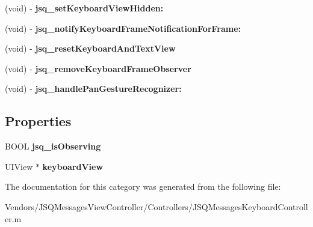 \begin{DoxyCompactItemize}
\item 
\hypertarget{category_j_s_q_messages_keyboard_controller_07_08_a1c4caa22f2eee5d2f6cac47e33a83d88}{}(void) -\/ {\bfseries jsq\+\_\+set\+Keyboard\+View\+Hidden\+:}\label{category_j_s_q_messages_keyboard_controller_07_08_a1c4caa22f2eee5d2f6cac47e33a83d88}

\item 
\hypertarget{category_j_s_q_messages_keyboard_controller_07_08_a1ca76e371471ca4d20aab547096079c9}{}(void) -\/ {\bfseries jsq\+\_\+notify\+Keyboard\+Frame\+Notification\+For\+Frame\+:}\label{category_j_s_q_messages_keyboard_controller_07_08_a1ca76e371471ca4d20aab547096079c9}

\item 
\hypertarget{category_j_s_q_messages_keyboard_controller_07_08_a2ecfdacc0439b70e6ab1c5dd03895ae9}{}(void) -\/ {\bfseries jsq\+\_\+reset\+Keyboard\+And\+Text\+View}\label{category_j_s_q_messages_keyboard_controller_07_08_a2ecfdacc0439b70e6ab1c5dd03895ae9}

\item 
\hypertarget{category_j_s_q_messages_keyboard_controller_07_08_ae546c926b53ecd316676e9b1762b3ac0}{}(void) -\/ {\bfseries jsq\+\_\+remove\+Keyboard\+Frame\+Observer}\label{category_j_s_q_messages_keyboard_controller_07_08_ae546c926b53ecd316676e9b1762b3ac0}

\item 
\hypertarget{category_j_s_q_messages_keyboard_controller_07_08_ab31eab0246d9198a3c81257f7361e9b9}{}(void) -\/ {\bfseries jsq\+\_\+handle\+Pan\+Gesture\+Recognizer\+:}\label{category_j_s_q_messages_keyboard_controller_07_08_ab31eab0246d9198a3c81257f7361e9b9}

\end{DoxyCompactItemize}
\subsection*{Properties}
\begin{DoxyCompactItemize}
\item 
\hypertarget{category_j_s_q_messages_keyboard_controller_07_08_a1aed8139f5222d4c7750da57fd2f0102}{}B\+O\+O\+L {\bfseries jsq\+\_\+is\+Observing}\label{category_j_s_q_messages_keyboard_controller_07_08_a1aed8139f5222d4c7750da57fd2f0102}

\item 
\hypertarget{category_j_s_q_messages_keyboard_controller_07_08_af8b90e2900ea8f9c9c762ce0f11402e1}{}U\+I\+View $\ast$ {\bfseries keyboard\+View}\label{category_j_s_q_messages_keyboard_controller_07_08_af8b90e2900ea8f9c9c762ce0f11402e1}

\end{DoxyCompactItemize}


The documentation for this category was generated from the following file\+:\begin{DoxyCompactItemize}
\item 
Vendors/\+J\+S\+Q\+Messages\+View\+Controller/\+Controllers/J\+S\+Q\+Messages\+Keyboard\+Controller.\+m\end{DoxyCompactItemize}
